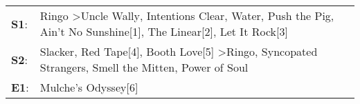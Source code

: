 \begin{supertabular}{p{0.03\textwidth}p{0.92\textwidth}}
 \textbf{S1}:  &  Ringo\textsuperscript{} \textgreater \enspace Uncle Wally\textsuperscript{}, \enspace Intentions Clear\textsuperscript{}, \enspace Water\textsuperscript{}, \enspace Push the Pig\textsuperscript{}, \enspace Ain't No Sunshine[1]\textsuperscript{}, \enspace The Linear[2]\textsuperscript{}, \enspace Let It Rock[3]\textsuperscript{}  \enspace  \\
 \textbf{S2}:  &                                          Slacker\textsuperscript{}, \enspace Red Tape[4]\textsuperscript{}, \enspace Booth Love[5]\textsuperscript{} \textgreater \enspace Ringo\textsuperscript{}, \enspace Syncopated Strangers\textsuperscript{}, \enspace Smell the Mitten\textsuperscript{}, \enspace Power of Soul\textsuperscript{}  \enspace  \\
 \textbf{E1}:  &                                                                                                                                                                                                                                                                                                      Mulche's Odyssey[6]\textsuperscript{}  \enspace  \\
\end{supertabular}
